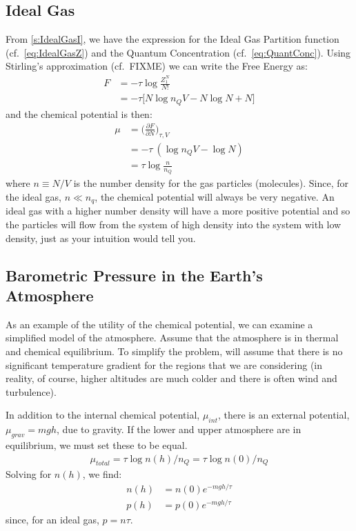 \subsection{Ideal Gas}
From \cref{s:IdealGasI}, we have the expression for the Ideal Gas
Partition function (cf.~\cref{eq:IdealGasZ}) and the Quantum 
Concentration (cf.~\cref{eq:QuantConc}). Using Stirling's 
approximation (cf.~FIXME) we can write the Free Energy
as:
\begin{align}
F &= -\tau \log{\frac{Z_{1}^N}{N!}} \\
  &= -\tau \bigg[N \log{n_Q V} - N \log{N} + N \bigg] 
\end{align}
and the chemical potential is then:
\begin{align}
\mu &= \bigg(\frac{\partial F}{\partial N}\bigg)_{\tau,V} \\
    &= -\tau~(\log{n_Q V} - \log{N}) \\
    &= \tau \log{\frac{n}{n_Q}}
\end{align} 
where $n \equiv N/V$ is the number density for the gas 
particles (molecules). Since, for the ideal gas, $n \ll n_q$, the
chemical potential will always be very negative. An ideal gas
with a higher number density will have a more positive potential
and so the particles will flow from the system of high density
into the system with low density, just as your intuition would
tell you.


\subsection{Barometric Pressure in the Earth's Atmosphere}
As an example of the utility of the chemical potential, we can examine
a simplified model of the atmosphere. Assume that the atmosphere
is in thermal and chemical equilibrium. To simplify the problem,
will assume that there is no significant temperature gradient for the
regions that we are considering (in reality, of course, higher
altitudes are much colder and there is often wind and turbulence).

In addition to the internal chemical potential, $\mu_{int}$, there is
an external potential,$\mu_{grav} = m g h$, due to gravity. If the lower
and upper atmosphere are in equilibrium, we must set these to be equal.
\begin{align}
\mu_{total} = \tau \log{n(h)/n_Q} = \tau \log{n(0)/n_Q}
\end{align}
Solving for $n(h)$, we find:
\begin{align}
n(h) &= n(0) e^{-m g h / \tau} \\
p(h) &= p(0) e^{-m g h / \tau}
\end{align}
since, for an ideal gas, $p = n \tau$.
